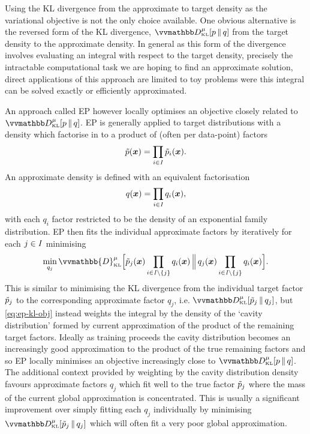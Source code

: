 Using the \ac{KL} divergence from the approximate to target density as the variational objective is not the only choice available. One obvious alternative is the reversed form of the \ac{KL} divergence, $\kldiv[\mu]{\tgtdens}{q}$ from the target density to the approximate density. In general as this form of the divergence involves evaluating an integral with respect to the target density, precisely the intractable computational task we are hoping to find an approximate solution, direct applications of this approach are limited to toy problems were this integral can be solved exactly or efficiently approximated. 

An approach called \ac{EP} \citep{minka2001expectation} however locally optimises an objective closely related to $\kldiv[\mu]{\tgtdens}{q}$. \ac{EP} is generally applied to target distributions with a density which factorise in to a product of (often per data-point) factors
\begin{equation}\label{eq:ep-target-density-factorisation}
  \tilde{p}(\boldsymbol{x}) = \prod_{i\in\mathit{I}} \tilde{p}_i(\boldsymbol{x}).
\end{equation}
An approximate density is defined with an equivalent factorisation
\begin{equation}\label{eq:ep-approximate-density-factorisation}
  q(\boldsymbol{x}) = \prod_{i\in\mathit{I}} q_i(\boldsymbol{x}),
\end{equation}
with each $q_i$ factor restricted to be the density of an exponential family distribution. \ac{EP} then fits the individual approximate factors by iteratively for each $j \in \mathit{I}$ minimising
\begin{equation}\label{eq:ep-kl-obj}
  \min_{q_j} \vvmathbb{D}_{\scriptscriptstyle\mathrm{KL}}^{\mu}
  \Big[
    {\utgtdens_j(\vct{x}) \prod_{i\in\set{I} \setminus \fset{j}} q_i(\vct{x})}
  \,\Big\Vert\,
    {q_j(\vct{x}) \prod_{i\in\set{I} \setminus \fset{j}} q_i(\vct{x})}
  \Big].
\end{equation}
This is similar to minimising the \ac{KL} divergence from the individual target factor $\tilde{p}_j$ to the corresponding approximate factor $q_j$, i.e. $\kldiv[\mu]{\utgtdens_j}{q_j}$, but \eqref{eq:ep-kl-obj} instead weights the integral by the density of the `cavity distribution' formed by current approximation of the product of the remaining target factors. Ideally as training proceeds the cavity distribution becomes an increasingly good approximation to the product of the true remaining factors and so \ac{EP} locally minimises an objective increasingly close to $\kldiv[\mu]{\tgtdens}{q}$. The additional context provided by weighting by the cavity distribution density favours approximate factors $q_j$ which fit well to the true factor $\tilde{p}_j$ where the mass of the current global approximation is concentrated. This is usually a significant improvement over simply fitting each $q_j$ individually by minimising $\kldiv[\mu]{\utgtdens_j}{q_j}$ which will often fit a very poor global approximation.

